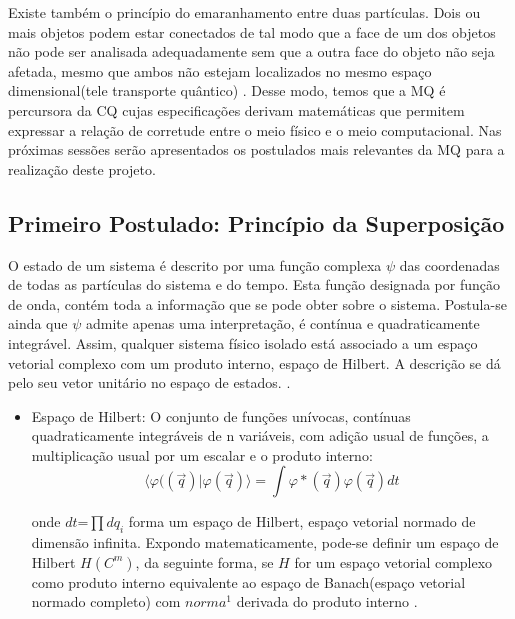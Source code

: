 \documentclass[tcc,capa]{texufpel}
\begin{document}
Existe também o princípio do emaranhamento entre duas partículas. Dois ou mais objetos podem estar conectados de tal modo que a face de um dos objetos não pode ser analisada adequadamente sem que a outra face do objeto não seja afetada, mesmo que ambos não estejam localizados no mesmo espaço dimensional(tele transporte quântico) \cite{chuang00a}. 
Desse modo, temos que a MQ é percursora da CQ cujas especificações derivam matemáticas que permitem expressar a relação de corretude entre o meio físico e o meio computacional. Nas próximas sessões serão apresentados os postulados mais relevantes da MQ para a realização deste projeto.

\subsection{Primeiro Postulado: Princípio da Superposição}

O estado de um sistema é descrito por uma função complexa $\psi$ das coordenadas de todas as partículas do sistema e do tempo. Esta função designada por função de onda, contém toda a informação que se pode obter sobre o sistema. Postula-se ainda que $\psi$ admite apenas uma interpretação, é contínua e quadraticamente integrável.
Assim, qualquer sistema físico isolado está associado a um espaço vetorial complexo com um produto interno, espaço de Hilbert. A descrição se dá pelo seu vetor unitário no espaço de estados. \cite{loss}.
\begin{itemize}
    \item Espaço de Hilbert: O conjunto de funções unívocas, contínuas quadraticamente integráveis de n variáveis, com adição usual de funções, a multiplicação usual por um escalar e o produto interno:
      \begin{equation}
  \langle\varphi((\vec{q})|\varphi(\vec{q})\rangle=\int \varphi * (\vec{q})\varphi(\vec{q})dt 
\end{equation}    

    onde $dt$=$\prod dq_i$ forma um espaço de Hilbert, espaço vetorial normado de dimensão infinita\cite{loss}. 
    Expondo matematicamente, pode-se definir um espaço de Hilbert $H (C^m)$, da seguinte forma, se $H$ for um espaço vetorial complexo como produto interno equivalente ao espaço de Banach(espaço vetorial normado completo) com $norma^1$ derivada do produto interno \cite{biezuner2009notas}.
\end{itemize}
\end{document}
